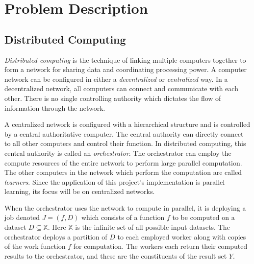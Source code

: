 \documentclass[../mthe-493-final-project.tex]{subfiles}
\begin{document}
    \chapter{Problem Description}
    \label{ch:problem-description}
    
    \section{Distributed Computing}
    \label{sec:distributed-computing-problem-description}


    \textit{Distributed computing} is the technique of linking multiple computers together to form a network for sharing data and coordinating processing power. A computer network can be configured in either a \textit{decentralized} or \textit{centralized} way. In a decentralized network, all computers can connect and communicate with each other. There is no single controlling authority which dictates the flow of information through the network.

    A centralized network is configured with a hierarchical structure and is controlled by a central authoritative computer. The central authority can directly connect to all other computers and control their function. In distributed computing, this central authority is called an \textit{orchestrator}. The orchestrator can employ the compute resources of the entire network to perform large parallel computation. The other computers in the network which perform the computation are called \textit{learners}. Since the application of this project's implementation is parallel learning, its focus will be on centralized networks.

    When the orchestrator uses the network to compute in parallel, it is deploying a job denoted $J = (f,D)$ which consists of a function $f$ to be computed on a dataset $D \subseteq \mathbb{X}$. Here $\mathbb{X}$ is the infinite set of all possible input datasets. The orchestrator deploys a partition of $D$ to each employed worker along with copies of the work function $f$ for computation. The workers each return their computed results to the orchestrator, and these are the constituents of the result set $Y$.
\end{document}
